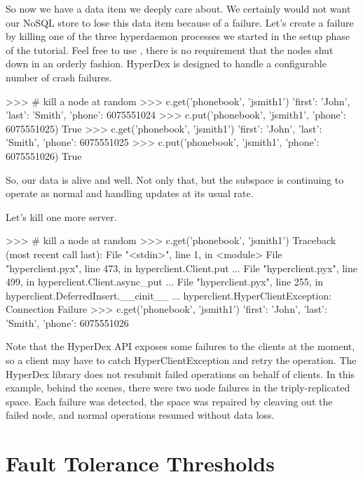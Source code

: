 So now we have a data item we deeply care about. We certainly would not want our
NoSQL store to lose this data item because of a failure. Let's create a failure
by killing one of the three hyperdaemon processes we started in the setup phase
of the tutorial. Feel free to use , there is no requirement that
the nodes shut down in an orderly fashion.  HyperDex is designed to handle a
configurable number of crash failures.

\begin{pythoncode}
>>> # kill a node at random
>>> c.get('phonebook', 'jsmith1')
{'first': 'John', 'last': 'Smith', 'phone': 6075551024}
>>> c.put('phonebook', 'jsmith1', {'phone': 6075551025})
True
>>> c.get('phonebook', 'jsmith1')
{'first': 'John', 'last': 'Smith', 'phone': 6075551025}
>>> c.put('phonebook', 'jsmith1', {'phone': 6075551026})
True
\end{pythoncode}

So, our data is alive and well. Not only that, but the subspace is continuing to
operate as normal and handling updates at its usual rate.

Let's kill one more server.

\begin{pythoncode}
>>> # kill a node at random
>>> c.get('phonebook', 'jsmith1')
Traceback (most recent call last):
File "<stdin>", line 1, in <module>
File "hyperclient.pyx", line 473, in hyperclient.Client.put ...
File "hyperclient.pyx", line 499, in hyperclient.Client.async_put ...
File "hyperclient.pyx", line 255, in hyperclient.DeferredInsert.__cinit__ ...
hyperclient.HyperClientException: Connection Failure
>>> c.get('phonebook', 'jsmith1')
{'first': 'John', 'last': 'Smith', 'phone': 6075551026}
\end{pythoncode}

Note that the HyperDex API exposes some failures to the clients at the moment,
so a client may have to catch HyperClientException and retry the operation.  The
HyperDex library does not resubmit failed operations on behalf of clients.  In
this example, behind the scenes, there were two node failures in the
triply-replicated space. Each failure was detected, the space was repaired by
cleaving out the failed node, and normal operations resumed without data loss.

\section{Fault Tolerance Thresholds}

